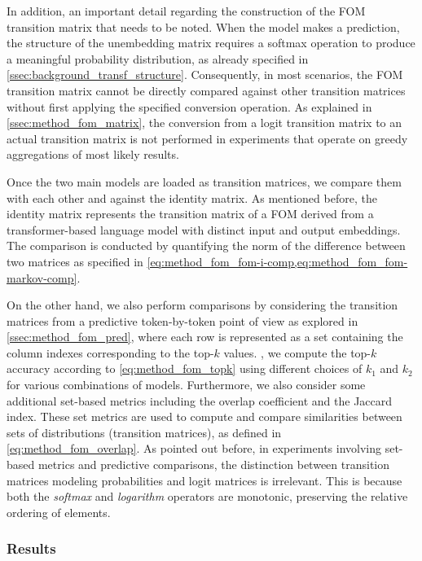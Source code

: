 In addition, an important detail regarding the construction of the FOM transition matrix that needs to be noted.
When the model makes a prediction, the structure of the unembedding matrix requires a softmax operation to produce a meaningful probability distribution, as already specified in \cref{ssec:background_transf_structure}.
Consequently, in most scenarios, the FOM transition matrix cannot be directly compared against other transition matrices without first applying the specified conversion operation.
As explained in \cref{ssec:method_fom_matrix}, the conversion from a logit transition matrix to an actual transition matrix is not performed in experiments that operate on greedy aggregations of most likely results.

Once the two main models are loaded as transition matrices, we compare them with each other and against the identity matrix.
As mentioned before, the identity matrix represents the transition matrix of a FOM derived from a transformer-based language model with distinct input and output embeddings.
The comparison is conducted by quantifying the norm of the difference between two matrices as specified in \cref{eq:method_fom_fom-i-comp,eq:method_fom_fom-markov-comp}.

On the other hand, we also perform comparisons by considering the transition matrices from a predictive token-by-token point of view as explored in \cref{ssec:method_fom_pred}, where each row is represented as a set containing the column indexes corresponding to the top-$k$ values.
, we compute the top-$k$ accuracy according to \cref{eq:method_fom_topk} using different choices of $k_1$ and $k_2$ for various combinations of models.
Furthermore, we also consider some additional set-based metrics including the overlap coefficient and the Jaccard index.
These set metrics are used to compute and compare similarities between sets of distributions (transition matrices), as defined in \cref{eq:method_fom_overlap}.
As pointed out before, in experiments involving set-based metrics and predictive comparisons, the distinction between transition matrices modeling probabilities and logit matrices is irrelevant.
This is because both the \emph{softmax} and \emph{logarithm} operators are monotonic, preserving the relative ordering of elements.

\subsubsection{Results}\label{sssec:exp_fom_exp1_results}

